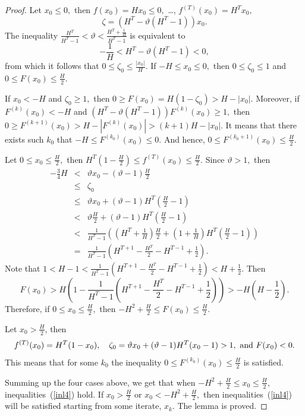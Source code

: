 \documentclass[12pt,a4paper]{amsart}
\begin{document}
\begin{proof}
Let $x_0\leq 0,$ then $f(x_0)=Hx_0\leq 0,$ \ldots, $f^{(T)}(x_0)=H^T x_0,$
$$
\zeta=\left(H^T - \vartheta (H^T - 1)\right)x_0.
$$
The inequality $\displaystyle{\frac{H^T}{H^T-1}<\vartheta<\frac{H^T+\frac{1}{H}}{H^T-1}}$ is equivalent to 
$$-\frac{1}{H}<H^T-\vartheta(H^T-1)<0,$$ from which it follows that $0\leq\zeta_0\leq\frac{|x_0|}{H}.$ If $-H\leq x_0\leq 0,$ then 
$0\leq\zeta_0\leq 1$ and $0\leq F(x_0)\leq \frac{H}{2}.$

If $x_0<-H$ and $\zeta_0\geq 1,$ then $0\geq F(x_0)=H(1-\zeta_0)>H-|x_0|.$ Moreover, if $F^{(k)}(x_0)<-H$ and 
$\left(H^T - \vartheta (H^T - 1)\right)F^{(k)}(x_0)\geq 1,$ then $0\geq F^{(k+1)}(x_0)>H-\left|F^{(k)}(x_0)\right|>(k+1)H-|x_0|.$
It means that there exists such $k_0$ that $-H\leq F^{(k_0)}(x_0)\leq 0.$ And hence, $0\leq F^{(k_0+1)}(x_0)\leq\frac{H}{2}.$

Let $0\leq x_0\leq \frac{H}{2},$ then $H^T \left(1-\frac{H}{2}\right)\leq f^{(T)}(x_0)\leq\frac{H}{2}.$ Since $\vartheta>1,$ then
\begin{eqnarray*}
-\frac34 H &<&\vartheta x_0 -(\vartheta-1)\frac{H}{2} \\
 &\leq& \zeta_0 \\
&\leq& \vartheta x_0 + (\vartheta-1)H^T\left(\frac{H}{2}-1\right)  \\
&<& \vartheta\frac{H}{2} + (\vartheta-1)H^T\left(\frac{H}{2}-1\right) \\
&<&\frac{1}{H^T-1}\left( \left( H^T+\frac{1}{H} \right)\frac{H}{2} + \left( 1+\frac{1}{H} \right) H^T \left( \frac{H}{2}-1 \right) \right)  \\
&=&\frac{1}{H^T-1} \left( H^{T+1} - \frac{H^T}{2} - H^{T-1} + \frac12\right).
\end{eqnarray*}
Note that $1<H-1<\frac{1}{H^T-1} \left( H^{T+1} - \frac{H^T}{2} - H^{T-1} + \frac12\right)<H+\frac12.$ Then 
$$
F(x_0) > H\left(1 - \frac{1}{H^T-1} \left( H^{T+1} - \frac{H^T}{2} - H^{T-1} + \frac12\right) \right) > -H\left(H - \frac12\right).
$$
Therefore, if $0\leq x_0\leq \frac{H}{2},$ then $-H^2+\frac{H}{2}\leq F(x_0) \leq \frac{H}{2}.$

Let $x_0 > \displaystyle{\frac{H}{2}}$, then 
$$f^{(T)}(x_0)=H^T (1-x_0), \quad \zeta_0 =\vartheta x_0 + (\vartheta - 1) H^T (x_0 - 1) > 1, \hbox{ and } F(x_0)<0.$$ 
This means that for some $k_0$ the inequality $0 \leq F^{(k_0)}(x_0) \leq \frac{H}{2}$ is satisfied.  

Summing up the four cases above, we get that when $-H^2+\frac{H}{2}\leq x_0 \leq \frac{H}{2},$ inequalities~(\ref{inl4}) hold. 
If $x_0>\frac{H}{2}$ or $x_0<-H^2+\frac{H}{2},$ then inequalities~(\ref{inl4}) will be satisfied starting from some iterate, $x_k$. 
The lemma is proved. 
\end{proof}
\end{document}
